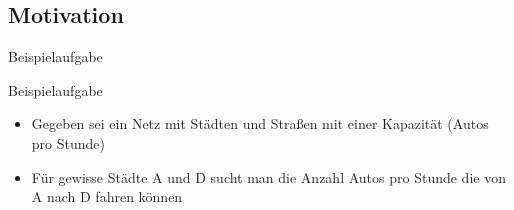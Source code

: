   \subsection{Motivation}
  \begin{frame}{Beispielaufgabe}
    \begin{block}{Beispielaufgabe}
      \begin{itemize}
        \item Gegeben sei ein Netz mit Städten und Straßen mit einer Kapazität (Autos pro Stunde)
        \pause
        \item Für gewisse Städte A und D sucht man die Anzahl Autos pro Stunde die von A nach D fahren können
      \end{itemize}
    \end{block}
  \end{frame}
